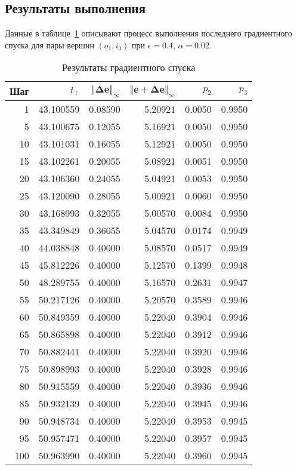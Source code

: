 \documentclass[a4paper]{article}
\newcommand{\de}{\bm{\Delta e}}
\begin{document}
\subsection{Результаты выполнения}

Данные в таблице~\ref{res2} описывают процесс выполнения последнего
градиентного спуска для пары вершин $(o_1, i_3)$ при $\epsilon = 0.4$, $\alpha
= 0.02$.

\begin{table}[H]
\caption{Результаты градиентного спуска}\label{res2}
\centering
\begin{tabular}{rrrrrr}
    \toprule
    Шаг &
    $t_{\top}$ &
    $\Vert \de \Vert_{\infty}$ &
    $\Vert \bm{e} + \de \Vert_{\infty}$ &
    $p_2$ & $p_3$ \\
    \midrule
    1   & 43.100559 & 0.08590 & 5.20921 & 0.0050 & 0.9950 \\
    5   & 43.100675 & 0.12055 & 5.16921 & 0.0050 & 0.9950 \\
    10  & 43.101031 & 0.16055 & 5.12921 & 0.0050 & 0.9950 \\
    15  & 43.102261 & 0.20055 & 5.08921 & 0.0051 & 0.9950 \\
    20  & 43.106360 & 0.24055 & 5.04921 & 0.0053 & 0.9950 \\
    25  & 43.120090 & 0.28055 & 5.00921 & 0.0060 & 0.9950 \\
    30  & 43.168993 & 0.32055 & 5.00570 & 0.0084 & 0.9950 \\
    35  & 43.349849 & 0.36055 & 5.04570 & 0.0174 & 0.9949 \\
    40  & 44.038848 & 0.40000 & 5.08570 & 0.0517 & 0.9949 \\
    45  & 45.812226 & 0.40000 & 5.12570 & 0.1399 & 0.9948 \\
    50  & 48.289755 & 0.40000 & 5.16570 & 0.2631 & 0.9947 \\
    55  & 50.217126 & 0.40000 & 5.20570 & 0.3589 & 0.9946 \\
    60  & 50.849359 & 0.40000 & 5.22040 & 0.3904 & 0.9946 \\
    65  & 50.865898 & 0.40000 & 5.22040 & 0.3912 & 0.9946 \\
    70  & 50.882441 & 0.40000 & 5.22040 & 0.3920 & 0.9946 \\
    75  & 50.898993 & 0.40000 & 5.22040 & 0.3928 & 0.9946 \\
    80  & 50.915559 & 0.40000 & 5.22040 & 0.3936 & 0.9946 \\
    85  & 50.932139 & 0.40000 & 5.22040 & 0.3945 & 0.9946 \\
    90  & 50.948734 & 0.40000 & 5.22040 & 0.3953 & 0.9945 \\
    95  & 50.957471 & 0.40000 & 5.22040 & 0.3957 & 0.9945 \\
    100 & 50.963990 & 0.40000 & 5.22040 & 0.3960 & 0.9945 \\
    \bottomrule
\end{tabular}
\end{table}
\end{document}
